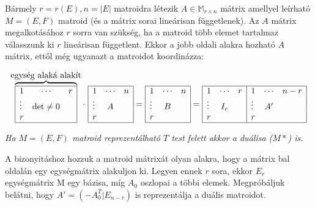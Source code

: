 Bármely $r=r(E), n=|E|$ matroidra létezik $A \in \mathbb{M}_{r\times n}$ mátrix
amellyel leírható $M=(E,F)$ matroid (és a mátrix sorai lineárisan függetlenek).
Az $A$ mátrix megalkotásához $r$ sorra van szükség, ha a matroid több elemet
tartalmaz válasszunk ki $r$ lineárisan függetlent. Ekkor a jobb oldali alakra
hozható $A$ mátrix, ettől még ugyanazt a matroidot koordinázza:

\[
\overbrace{
\begin{array}{|lcr|}
\hline
1 & \cdots & r\\
\vdots  & \mbox{det} \neq 0 &\\
r &  & \\
\hline
\end{array}}^{\mbox{egység alaká alakít}}
\cdot~
\begin{array}{|lcr|}
\hline
1 & \cdots & n\\
\vdots  & A &\\
r &  & \\
\hline
\end{array}
=
\begin{array}{|lcr|}
\hline
1 & \cdots & n\\
\vdots  & B &\\
r &  & \\
\hline
\end{array}
=
\begin{array}{|lcr|lcr|}
\hline
1 & \cdots & r &1&\cdots&n-r\\
\vdots  & I_r &&\vdots&A'&\\
r &  & & r&&\\
\hline
\end{array}
\]

\emph{Ha $M=(E,F)$ matroid reprezentálható $T$ test felett akkor a duálisa ($M*$) is.}

A bizonyitáshoz hozzuk a matroid mátrixát olyan alakra, hogy a mátrix bal
oldalán egy egységmátrix alakuljon ki. Legyen ennek $r$ sora, ekkor $E_r$ egységmátrix
M egy bázisa, míg $A_0$ oszlopai a többi elemek. Megpróbáljuk belátni, hogy $A'=(-A_0^T|E_{n-r})$
is reprezentálja a duális matroidot.

